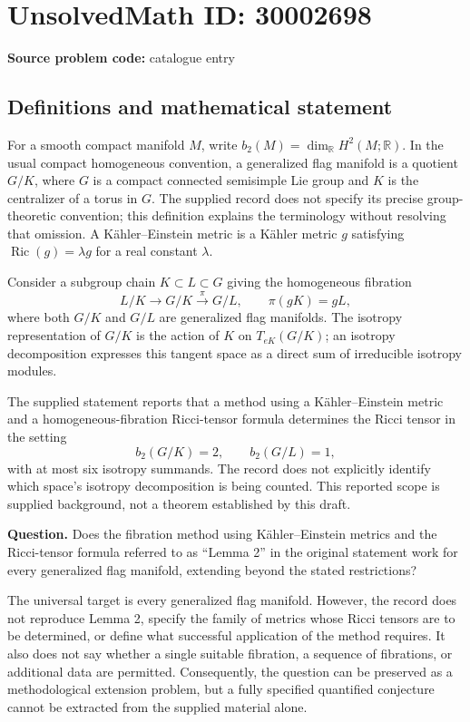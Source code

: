 \documentclass[11pt]{article}
\newcommand{\R}{\mathbb{R}}
\begin{document}
\section*{UnsolvedMath ID: 30002698}
\textbf{Source problem code:} catalogue entry
\subsection{Definitions and mathematical statement}
For a smooth compact manifold \(M\), write \(b_2(M)=\dim_{\R}H^2(M;\R)\). In the usual compact homogeneous convention, a generalized flag manifold is a quotient \(G/K\), where \(G\) is a compact connected semisimple Lie group and \(K\) is the centralizer of a torus in \(G\). The supplied record does not specify its precise group-theoretic convention; this definition explains the terminology without resolving that omission. A Kähler--Einstein metric is a Kähler metric \(g\) satisfying \(\operatorname{Ric}(g)=\lambda g\) for a real constant \(\lambda\).

Consider a subgroup chain \(K\subset L\subset G\) giving the homogeneous fibration
\[
L/K\longrightarrow G/K\xrightarrow{\ \pi\ }G/L,
\qquad \pi(gK)=gL,
\]
where both \(G/K\) and \(G/L\) are generalized flag manifolds. The isotropy representation of \(G/K\) is the action of \(K\) on \(T_{eK}(G/K)\); an isotropy decomposition expresses this tangent space as a direct sum of irreducible isotropy modules.

The supplied statement reports that a method using a Kähler--Einstein metric and a homogeneous-fibration Ricci-tensor formula determines the Ricci tensor in the setting
\[
b_2(G/K)=2,\qquad b_2(G/L)=1,
\]
with at most six isotropy summands. The record does not explicitly identify which space's isotropy decomposition is being counted. This reported scope is supplied background, not a theorem established by this draft.

\textbf{Question.} Does the fibration method using Kähler--Einstein metrics and the Ricci-tensor formula referred to as ``Lemma 2'' in the original statement work for every generalized flag manifold, extending beyond the stated restrictions?

The universal target is every generalized flag manifold. However, the record does not reproduce Lemma 2, specify the family of metrics whose Ricci tensors are to be determined, or define what successful application of the method requires. It also does not say whether a single suitable fibration, a sequence of fibrations, or additional data are permitted. Consequently, the question can be preserved as a methodological extension problem, but a fully specified quantified conjecture cannot be extracted from the supplied material alone.
\end{document}
